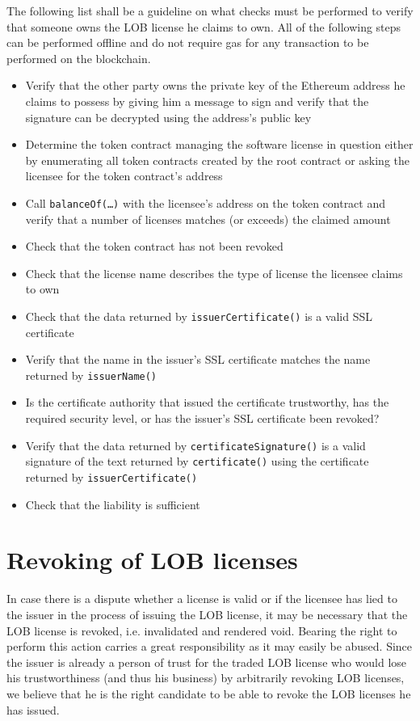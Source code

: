 \documentclass[a4paper]{article}
\begin{document}
The following list shall be a guideline on what checks must be performed to verify that someone owns the LOB license he claims to own. All of the following steps can be performed offline and do not require gas for any transaction to be performed on the blockchain.

\begin{itemize}
  \item Verify that the other party owns the private key of the Ethereum address he claims to possess by giving him a message to sign and verify that the signature can be decrypted using the address's public key
  \item Determine the token contract managing the software license in question either by enumerating all token contracts created by the root contract or asking the licensee for the token contract's address
  \item Call \texttt{balanceOf(…)} with the licensee's address on the token contract and verify that a number of licenses matches (or exceeds) the claimed amount
  \item Check that the token contract has not been revoked
  \item Check that the license name describes the type of license the licensee claims to own
  \item Check that the data returned by \texttt{issuerCertificate()} is a valid SSL certificate
  \item Verify that the name in the issuer's SSL certificate matches the name returned by \texttt{issuerName()}
  \item Is the certificate authority that issued the certificate trustworthy, has the required security level, or has the issuer's SSL certificate been revoked?
  \item Verify that the data returned by \texttt{certificateSignature()} is a valid signature of the text returned by \texttt{certificate()} using the certificate returned by \texttt{issuerCertificate()}
  \item Check that the liability is sufficient
\end{itemize}

\section{Revoking of LOB licenses}
\label{ch:revoking}

In case there is a dispute whether a license is valid or if the licensee has lied to the issuer in the process of issuing the LOB license, it may be necessary that the LOB license is revoked, i.e. invalidated and rendered void. Bearing the right to perform this action carries a great responsibility as it may easily be abused. Since the issuer is already a person of trust for the traded LOB license who would lose his trustworthiness (and thus his business) by arbitrarily revoking LOB licenses, we believe that he is the right candidate to be able to revoke the LOB licenses he has issued. 
\end{document}
